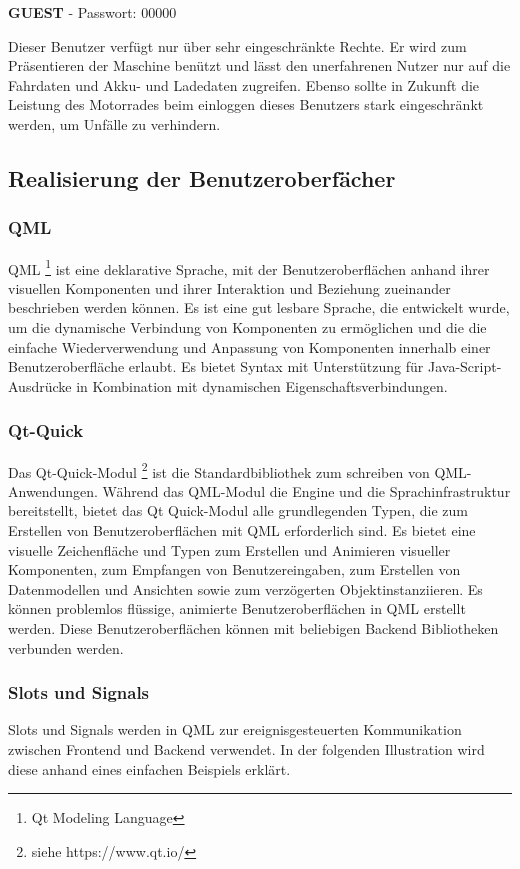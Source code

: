 {\small \textbf{GUEST}} - Passwort: 00000\\ \vspace{2mm}

Dieser Benutzer verfügt nur über sehr eingeschränkte Rechte. Er wird zum Präsentieren der Maschine benützt und lässt den unerfahrenen Nutzer nur auf die Fahrdaten und Akku- und Ladedaten zugreifen. Ebenso sollte in Zukunft die Leistung des Motorrades beim einloggen dieses Benutzers stark eingeschränkt werden, um Unfälle zu verhindern.

\newpage

\subsection{Realisierung der Benutzeroberfächer}

\subsubsection{QML} \label{sec:qml}
QML \footnote{Qt Modeling Language} ist eine deklarative Sprache, mit der Benutzeroberflächen anhand ihrer visuellen Komponenten und ihrer Interaktion und Beziehung zueinander beschrieben werden können. Es ist eine gut lesbare Sprache, die entwickelt wurde, um die dynamische Verbindung von Komponenten zu ermöglichen und die die einfache Wiederverwendung und Anpassung von Komponenten innerhalb einer Benutzeroberfläche erlaubt. Es bietet  Syntax mit Unterstützung für Java-Script-Ausdrücke in Kombination mit dynamischen Eigenschaftsverbindungen.

\subsubsection{Qt-Quick}
Das Qt-Quick-Modul \footnote{siehe https://www.qt.io/} ist die Standardbibliothek zum schreiben von QML-Anwendungen. Während das QML-Modul die Engine und die Sprachinfrastruktur bereitstellt, bietet das Qt Quick-Modul alle grundlegenden Typen, die zum Erstellen von Benutzeroberflächen mit QML erforderlich sind. Es bietet eine visuelle Zeichenfläche und Typen zum Erstellen und Animieren visueller Komponenten, zum Empfangen von Benutzereingaben, zum Erstellen von Datenmodellen und Ansichten sowie zum verzögerten Objektinstanziieren. Es können problemlos flüssige, animierte Benutzeroberflächen in QML erstellt werden. Diese Benutzeroberflächen können mit beliebigen Backend Bibliotheken verbunden werden.

\subsubsection{Slots und Signals} \label{sec:slots}
Slots und Signals werden in QML zur ereignisgesteuerten Kommunikation zwischen Frontend und Backend verwendet. In der folgenden Illustration wird diese anhand eines einfachen Beispiels erklärt.

